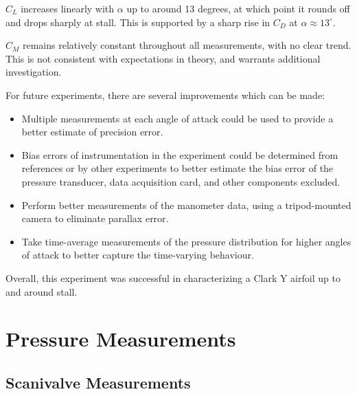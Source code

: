 \documentclass[runningheads]{llncs}
\begin{document}
\noindent
$C_L$ increases linearly with $\alpha$ up to around 13 degrees, at which point it rounds off and drops sharply at stall. This is supported by a sharp rise in $C_D$ at $\alpha \approx 13^\circ$.

\noindent
$C_M$ remains relatively constant throughout all measurements, with no clear trend. This is not consistent with expectations in theory, and warrants additional investigation.

\noindent
For future experiments, there are several improvements which can be made:
\begin{itemize}
    \item Multiple measurements at each angle of attack could be used to provide a better estimate of precision error.
    \item Bias errors of instrumentation in the experiment could be determined from references or by other experiments to better estimate the bias error of the pressure transducer, data acquisition card, and other components excluded.
    \item Perform better measurements of the manometer data, using a tripod-mounted camera to eliminate parallax error.
    \item Take time-average measurements of the pressure distribution for higher angles of attack to better capture the time-varying behaviour.
\end{itemize}

\noindent
Overall, this experiment was successful in characterizing a Clark Y airfoil up to and around stall.










\appendix

\section{Pressure Measurements}

\subsection{Scanivalve Measurements}
\end{document}
